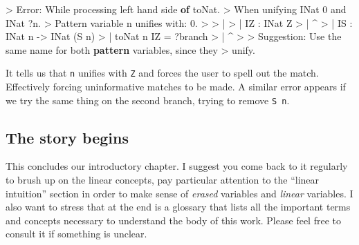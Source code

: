 \documentclass[
]{article}
\newenvironment{Shaded}{}{}
\newcommand{\DataTypeTok}[1]{\textcolor[rgb]{0.56,0.13,0.00}{#1}}
\newcommand{\DecValTok}[1]{\textcolor[rgb]{0.25,0.63,0.44}{#1}}
\newcommand{\FunctionTok}[1]{\textcolor[rgb]{0.02,0.16,0.49}{#1}}
\newcommand{\KeywordTok}[1]{\textcolor[rgb]{0.00,0.44,0.13}{\textbf{#1}}}
\newcommand{\NormalTok}[1]{#1}
\newcommand{\OperatorTok}[1]{\textcolor[rgb]{0.40,0.40,0.40}{#1}}
\newcommand{\OtherTok}[1]{\textcolor[rgb]{0.00,0.44,0.13}{#1}}
\begin{document}
\begin{Shaded}
\begin{Highlighting}[]
\OperatorTok{\textgreater{}} \DataTypeTok{Error}\OperatorTok{:} \DataTypeTok{While}\NormalTok{ processing left hand side }\KeywordTok{of}\NormalTok{ toNat}\OperatorTok{.} 
\OperatorTok{\textgreater{}}   \DataTypeTok{When}\NormalTok{ unifying }\DataTypeTok{INat} \DecValTok{0} \FunctionTok{and} \DataTypeTok{INat} \OperatorTok{?}\NormalTok{n}\OperatorTok{.}
\OperatorTok{\textgreater{}} \DataTypeTok{Pattern}\NormalTok{ variable n unifies with}\OperatorTok{:} \DecValTok{0}\OperatorTok{.}
\OperatorTok{\textgreater{}} 
\OperatorTok{\textgreater{}}     \OperatorTok{|}
\OperatorTok{\textgreater{}}     \OperatorTok{|}   \DataTypeTok{IZ} \OperatorTok{:} \DataTypeTok{INat} \DataTypeTok{Z}
\OperatorTok{\textgreater{}}     \OperatorTok{|}             \OperatorTok{\^{}}
\OperatorTok{\textgreater{}}     \OperatorTok{|}   \DataTypeTok{IS} \OperatorTok{:} \DataTypeTok{INat}\NormalTok{ n }\OtherTok{{-}\textgreater{}} \DataTypeTok{INat}\NormalTok{ (}\DataTypeTok{S}\NormalTok{ n)}
\OperatorTok{\textgreater{}}     \OperatorTok{|}\NormalTok{  toNat n }\DataTypeTok{IZ} \OtherTok{=} \OperatorTok{?}\NormalTok{branch}
\OperatorTok{\textgreater{}}     \OperatorTok{|}        \OperatorTok{\^{}}
\OperatorTok{\textgreater{}} 
\OperatorTok{\textgreater{}} \DataTypeTok{Suggestion}\OperatorTok{:} \DataTypeTok{Use}\NormalTok{ the same name for both }\KeywordTok{pattern}\NormalTok{ variables, since they }
\OperatorTok{\textgreater{}}\NormalTok{   unify}\OperatorTok{.}
\end{Highlighting}
\end{Shaded}

It tells us that \texttt{n} unifies with \texttt{Z} and forces the user
to spell out the match. Effectively forcing uninformative matches to be
made. A similar error appears if we try the same thing on the second
branch, trying to remove \texttt{S\ n}.

\hypertarget{the-story-begins}{%
\subsection{The story begins}\label{the-story-begins}}

This concludes our introductory chapter. I suggest you come back to it
regularly to brush up on the linear concepts, pay particular attention
to the ``linear intuition'' section in order to make sense of
\emph{erased} variables and \emph{linear} variables. I also want to
stress that at the end is a glossary that lists all the important terms
and concepts necessary to understand the body of this work. Please feel
free to consult it if something is unclear.
\end{document}
